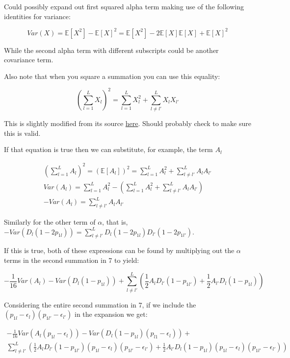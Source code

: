 \documentclass[a4paper,10pt]{article}
\begin{document}
Could possibly expand out first squared alpha term making use of the following identities for variance: 

\begin{equation}
   \label{3}
   Var(X) = \mathbb{E}[X^2] - \mathbb{E}[X]^2
   = \mathbb{E}[X^2] - 2\mathbb{E}[X]\mathbb{E}[X] + \mathbb{E}[X]^2
\end{equation}

While the second alpha term with different subscripts could be another covariance term. 

Also note that when you square a summation you can use this equality: 

\begin{equation}
    \label{4}
    (\sum^L_{l=1} X_l )^2 = \sum^L_{l=1} X_l^2 + \sum^L_{l \neq l'} X_l X_{l'}
\end{equation}

This is slightly modified from its source \href{https://math.stackexchange.com/questions/329344/what-is-the-square-of-summation}{here}. Should probably check to make sure this is valid.

If that equation is true then we can substitute, for example, the term $A_l$

\begin{align}
    (\sum^L_{l=1} A_l )^2 = (\mathbb{E}[A_l])^2 = \sum^L_{l=1} A_l^2 + \sum^L_{l \neq l'} A_l A_{l'} \\
    Var(A_l) = \sum^L_{l=1} A_l^2 - (\sum^L_{l=1} A_l^2 + \sum^L_{l \neq l'} A_l A_{l'}) \\
    - Var(A_l)= \sum^L_{l \neq l'} A_l A_{l'}
\end{align}

Similarly for the other term of $\alpha$, that is, $-Var(D_l(1-2p_{1l})) = \sum^L_{l \neq l'} D_l(1-2p_{1l}) D_{l'}(1-2p_{1l'})$.

If this is true, both of these expressions can be found by multiplying out the $\alpha$ terms in the second summation in 7 to yield: 

\begin{equation}
   - \frac{1}{16} Var(A_l) - Var(D_{l}(1-p_{1l})) + \sum_{l \neq l'}^L ( \frac{1}{2}A_l D_{l'}(1-p_{1l'}) + \frac{1}{2}A_{l'} D_{l}(1-p_{1l}) )
 \end{equation}

 Considering the entire second summation in 7, if we include the
 $(p_{1l}-\epsilon_{l})(p_{1l'}-\epsilon_{l'})$ in the expansion we get:

 \begin{equation}
 \begin{split}
   - \frac{1}{16} Var(A_l(p_{1l}-\epsilon_l)) -
   Var(D_{l}(1-p_{1l})(p_{l1}-\epsilon_l)) + \\
   \sum_{l \neq l'}^L ( \frac{1}{2}A_l D_{l'}(1-p_{1l'})(p_{1l}-\epsilon_{l})(p_{1l'}-\epsilon_{l'}) + \frac{1}{2}A_{l'} D_{l}(1-p_{1l})(p_{1l}-\epsilon_{l})(p_{1l'}-\epsilon_{l'}))
 \end {split}
 \end {equation}
 
\end{document}
